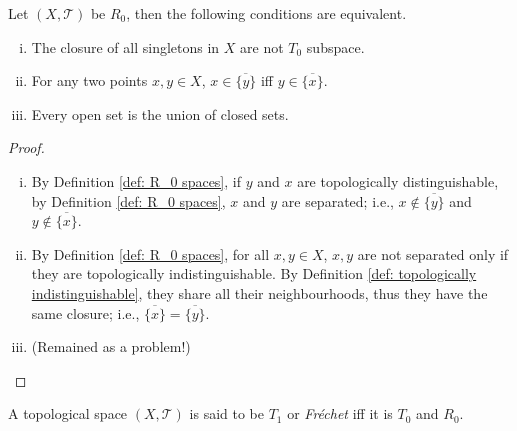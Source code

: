 \begin{proposition}
	\label{prop: alternative definitions of R_0 spaces}
	Let $(X, \mathcal T)$ be $R_0$, then the following conditions are equivalent.
	\begin{enumerate}[(i)]
		\item
		The closure of all singletons in $X$ are not $T_0$ subspace.
		
		\item
		For any two points $x,y \in X$, $x \in \overline{ \{y\} }$ iff $y \in \overline{ \{x\} }$.
		
		\item
		Every open set is the union of closed sets.
	\end{enumerate}
	
	\begin{proof}
		\
		\begin{enumerate}[(i)]
			\item
			By Definition \ref{def: R_0 spaces}, if $y$ and $x$ are topologically distinguishable, by Definition \ref{def: R_0 spaces}, $x$ and $y$ are separated; i.e., $x \notin \overline {\{y\}}$ and $y \notin \overline{\{x\}}$.
			
			\item
			By Definition \ref{def: R_0 spaces}, for all $x,y \in X$, $x,y$ are not separated only if they are topologically indistinguishable. By Definition \ref{def: topologically indistinguishable}, they share all their neighbourhoods, thus they have the same closure; i.e., $\overline{\{x\}} = \overline{\{y\}}$.
			
			\item
			(Remained as a problem!)
		\end{enumerate}
	\end{proof}
\end{proposition}



\begin{definition}
	[$T_1$ spaces]
	\label{def: T_1 spaces}
	A topological space $(X, \mathcal T)$ is said to be $T_1$ or \textit{Fr\'echet} iff it is $T_0$ and $R_0$.
\end{definition}


